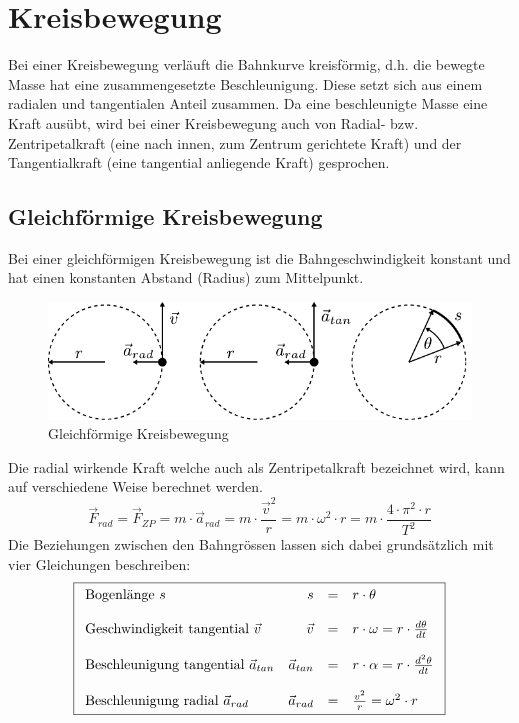 \chapter{Kreisbewegung}
Bei einer Kreisbewegung verläuft die Bahnkurve kreisförmig,
d.h. die bewegte Masse hat eine zusammengesetzte Beschleunigung.
Diese setzt sich aus einem radialen und tangentialen Anteil 
zusammen. Da eine beschleunigte Masse eine Kraft ausübt, wird 
bei einer Kreisbewegung auch von Radial- bzw. Zentripetalkraft
(eine nach innen, zum Zentrum gerichtete Kraft) und der 
Tangentialkraft (eine tangential anliegende Kraft) gesprochen.

\newpage
\section{Gleichförmige Kreisbewegung}
Bei einer gleichförmigen Kreisbewegung ist die Bahngeschwindigkeit
konstant und hat einen konstanten Abstand (Radius) zum Mittelpunkt.

\begin{figure}[h!]
	\centering
	\includegraphics[scale=0.8]{../fig/kreisbewegung.pdf}
	\caption{Gleichförmige Kreisbewegung}
	\label{fig:kreisbewegung}
\end{figure}

\noindent
Die radial wirkende Kraft welche auch als Zentripetalkraft 
bezeichnet wird, kann auf verschiedene Weise berechnet werden.
\[ \boxed{\vec{F}_{rad} = \vec{F}_{ZP} 
	= m \cdot \vec{a}_{rad}
	= m \cdot \frac{\vec{v}^2}{r} 
	= m \cdot \omega^2 \cdot r 
	= m \cdot \frac{4 \cdot \pi^2 \cdot r}{T^2} } \]
Die Beziehungen zwischen den Bahngrössen lassen sich dabei 
grundsätzlich mit vier Gleichungen beschreiben:
\[ \boxed{ \begin{array}{l r c l}
	\text{Bogenlänge $s$} & 
		s &=& r \cdot \theta \\
	& & & \\
	\text{Geschwindigkeit tangential $\vec{v}$} &
		\vec{v} &=& r \cdot \omega
		= r \cdot \frac{d\theta}{dt} \\
	& & & \\
	\text{Beschleunigung tangential $\vec{a}_{tan}$} &
		\vec{a}_{tan} &=& r \cdot \alpha 
		= r \cdot \frac{d^2\theta}{dt} \\
	& & & \\
	\text{Beschleunigung radial $\vec{a}_{rad}$} &
		\vec{a}_{rad} &=& \frac{v^2}{r} = \omega^2 \cdot r
\end{array} }\]

